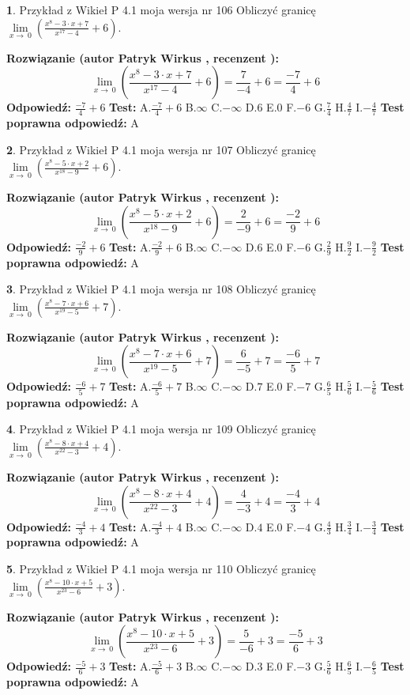 \documentclass[12pt, a4paper]{article}
\theoremstyle{definition} %
\newtheorem{zad}{}
\newcommand{\zadStart}[1]{\begin{zad}#1\newline}
\newcommand{\zadStop}{\end{zad}}
\newcommand{\rozwStart}[2]{\noindent \textbf{Rozwiązanie (autor #1 , recenzent #2): }\newline}
\newcommand{\rozwStop}{\newline}
\newcommand{\odpStart}{\noindent \textbf{Odpowiedź:}\newline}
\newcommand{\odpStop}{\newline}
\newcommand{\testStart}{\noindent \textbf{Test:}\newline}
\newcommand{\testStop}{\newline}
\newcommand{\kluczStart}{\noindent \textbf{Test poprawna odpowiedź:}\newline}
\newcommand{\kluczStop}{\newline}
\begin{document}
\zadStart{Przykład z Wikieł P 4.1 moja wersja nr 106}
Obliczyć granicę $\lim\limits_{x\to\ 0}(\frac{x^{8}-3 \cdot x +7}{x^{17}-4}+6)$.
\zadStop
\rozwStart{Patryk Wirkus}{}
$$\lim\limits_{x\to\ 0}(\frac{x^{8}-3 \cdot x +7}{x^{17}-4}+6)=\frac{7}{-4}+6=\frac{-7}{4}+6$$
\rozwStop
\odpStart
$\frac{-7}{4}+6$
\odpStop
\testStart
A.$\frac{-7}{4}+6$
B.$\infty$
C.$-\infty$
D.$6$
E.$0$
F.$-6$
G.$\frac{7}{4}$
H.$\frac{4}{7}$
I.$-\frac{4}{7}$
\testStop
\kluczStart
A
\kluczStop



\zadStart{Przykład z Wikieł P 4.1 moja wersja nr 107}
Obliczyć granicę $\lim\limits_{x\to\ 0}(\frac{x^{8}-5 \cdot x +2}{x^{18}-9}+6)$.
\zadStop
\rozwStart{Patryk Wirkus}{}
$$\lim\limits_{x\to\ 0}(\frac{x^{8}-5 \cdot x +2}{x^{18}-9}+6)=\frac{2}{-9}+6=\frac{-2}{9}+6$$
\rozwStop
\odpStart
$\frac{-2}{9}+6$
\odpStop
\testStart
A.$\frac{-2}{9}+6$
B.$\infty$
C.$-\infty$
D.$6$
E.$0$
F.$-6$
G.$\frac{2}{9}$
H.$\frac{9}{2}$
I.$-\frac{9}{2}$
\testStop
\kluczStart
A
\kluczStop



\zadStart{Przykład z Wikieł P 4.1 moja wersja nr 108}
Obliczyć granicę $\lim\limits_{x\to\ 0}(\frac{x^{8}-7 \cdot x +6}{x^{19}-5}+7)$.
\zadStop
\rozwStart{Patryk Wirkus}{}
$$\lim\limits_{x\to\ 0}(\frac{x^{8}-7 \cdot x +6}{x^{19}-5}+7)=\frac{6}{-5}+7=\frac{-6}{5}+7$$
\rozwStop
\odpStart
$\frac{-6}{5}+7$
\odpStop
\testStart
A.$\frac{-6}{5}+7$
B.$\infty$
C.$-\infty$
D.$7$
E.$0$
F.$-7$
G.$\frac{6}{5}$
H.$\frac{5}{6}$
I.$-\frac{5}{6}$
\testStop
\kluczStart
A
\kluczStop



\zadStart{Przykład z Wikieł P 4.1 moja wersja nr 109}
Obliczyć granicę $\lim\limits_{x\to\ 0}(\frac{x^{8}-8 \cdot x +4}{x^{22}-3}+4)$.
\zadStop
\rozwStart{Patryk Wirkus}{}
$$\lim\limits_{x\to\ 0}(\frac{x^{8}-8 \cdot x +4}{x^{22}-3}+4)=\frac{4}{-3}+4=\frac{-4}{3}+4$$
\rozwStop
\odpStart
$\frac{-4}{3}+4$
\odpStop
\testStart
A.$\frac{-4}{3}+4$
B.$\infty$
C.$-\infty$
D.$4$
E.$0$
F.$-4$
G.$\frac{4}{3}$
H.$\frac{3}{4}$
I.$-\frac{3}{4}$
\testStop
\kluczStart
A
\kluczStop



\zadStart{Przykład z Wikieł P 4.1 moja wersja nr 110}
Obliczyć granicę $\lim\limits_{x\to\ 0}(\frac{x^{8}-10 \cdot x +5}{x^{23}-6}+3)$.
\zadStop
\rozwStart{Patryk Wirkus}{}
$$\lim\limits_{x\to\ 0}(\frac{x^{8}-10 \cdot x +5}{x^{23}-6}+3)=\frac{5}{-6}+3=\frac{-5}{6}+3$$
\rozwStop
\odpStart
$\frac{-5}{6}+3$
\odpStop
\testStart
A.$\frac{-5}{6}+3$
B.$\infty$
C.$-\infty$
D.$3$
E.$0$
F.$-3$
G.$\frac{5}{6}$
H.$\frac{6}{5}$
I.$-\frac{6}{5}$
\testStop
\kluczStart
A
\kluczStop
\end{document}
